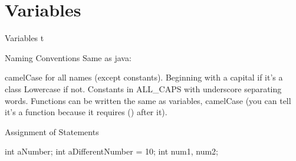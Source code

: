 \documentclass[../lecture2-variablesandcontrolstructures.tex]{subfiles}
\begin{document}
\section{Variables}


\begin{frame}[fragile]{Variables}
t 
\end{frame}


\begin{frame}[fragile]{Naming Conventions}
Same as java:

camelCase for all names (except constants).
Beginning with a capital if it's a class
Lowercase if not.
Constants in ALL_CAPS with underscore separating words.
Functions can be written the same as variables, camelCase (you can tell it's a function because it requires () after it).
\end{frame}


\begin{frame}[fragile]{Assignment of Statements}

int aNumber;
int aDifferentNumber = 10;
int num1, num2;

\end{frame}

\end{document}
